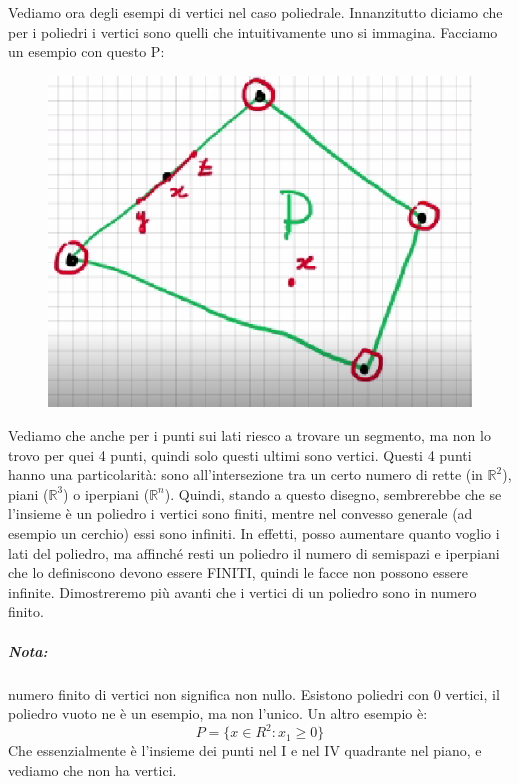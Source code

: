 \noindent Vediamo ora degli esempi di vertici nel caso poliedrale. Innanzitutto diciamo che per i poliedri i vertici sono quelli che intuitivamente uno si immagina. Facciamo un esempio con questo P:
\begin{figure}[h!]
    \centering
    \includegraphics[scale=0.5]{PoliedroVertici.png}
\end{figure}

\noindent Vediamo che anche per i punti sui lati riesco a trovare un segmento, ma non lo trovo per quei 4 punti, quindi solo questi ultimi sono vertici. Questi 4 punti hanno una particolarità: sono all'intersezione tra un certo numero di rette (in $\mathbb{R}^2$), piani ($\mathbb{R}^3$) o iperpiani ($\mathbb{R}^n$). Quindi, stando a questo disegno, sembrerebbe che se l'insieme è un poliedro i vertici sono finiti, mentre nel convesso generale (ad esempio un cerchio) essi sono infiniti. In effetti, posso aumentare quanto voglio i lati del poliedro, ma affinché resti un poliedro il numero di semispazi e iperpiani che lo definiscono devono essere FINITI, quindi le facce non possono essere infinite. Dimostreremo più avanti che i vertici di un poliedro sono in numero finito.

\subparagraph{Nota:} numero finito di vertici non significa non nullo. Esistono poliedri con 0 vertici, il poliedro vuoto ne è un esempio, ma non l'unico. Un altro esempio è:
\begin{equation*}
    P = \{x \in R^2: x_1 \geq 0\}
\end{equation*}
Che essenzialmente è l'insieme dei punti nel I e nel IV quadrante nel piano, e vediamo che non ha vertici.


